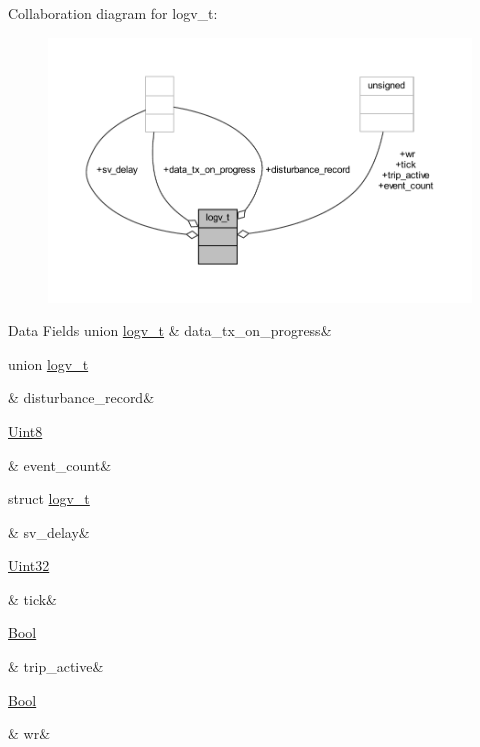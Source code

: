 Collaboration diagram for logv\+\_\+t\+:\nopagebreak
\begin{figure}[H]
\begin{center}
\leavevmode
\includegraphics[width=350pt]{d3/d50/a00882}
\end{center}
\end{figure}
\begin{DoxyFields}{Data Fields}
\hypertarget{a00021_a6cdefde69642ef511e3252c38be68516}{union \hyperlink{a00021_d7/db1/a00590}{logv\+\_\+t}}\label{a00021_a6cdefde69642ef511e3252c38be68516}
&
data\+\_\+tx\+\_\+on\+\_\+progress&
\\
\hline

\hypertarget{a00021_a11ed024c2cc5c53c79b2c0a8b35e3c06}{union \hyperlink{a00021_d0/dec/a00592}{logv\+\_\+t}}\label{a00021_a11ed024c2cc5c53c79b2c0a8b35e3c06}
&
disturbance\+\_\+record&
\\
\hline

\hypertarget{a00021_a4c7422d0fe07c8f97b6ff69a453a2251}{\hyperlink{a00072_af84840501dec18061d18a68c162a8fa2}{Uint8}}\label{a00021_a4c7422d0fe07c8f97b6ff69a453a2251}
&
event\+\_\+count&
\\
\hline

\hypertarget{a00021_a854b8f967c206a5f3e4aeaf91a782b3e}{struct \hyperlink{a00021_da/de4/a00594}{logv\+\_\+t}}\label{a00021_a854b8f967c206a5f3e4aeaf91a782b3e}
&
sv\+\_\+delay&
\\
\hline

\hypertarget{a00021_a81f0ce68c2c483fb8df726cc1988d8e8}{\hyperlink{a00072_aba99025e657f892beb7ff31cecf64653}{Uint32}}\label{a00021_a81f0ce68c2c483fb8df726cc1988d8e8}
&
tick&
\\
\hline

\hypertarget{a00021_a32ebd32977bc9831cd68530b2b7ec664}{\hyperlink{a00072_a253b248072cfc8bd812c69acd0046eed}{Bool}}\label{a00021_a32ebd32977bc9831cd68530b2b7ec664}
&
trip\+\_\+active&
\\
\hline

\hypertarget{a00021_a11ea0eda9ab27873198e7a5c4be4337d}{\hyperlink{a00072_a253b248072cfc8bd812c69acd0046eed}{Bool}}\label{a00021_a11ea0eda9ab27873198e7a5c4be4337d}
&
wr&
\\
\hline

\end{DoxyFields}
\label{db/ddc/a00353}
\hypertarget{a00021_db/ddc/a00353}{}
